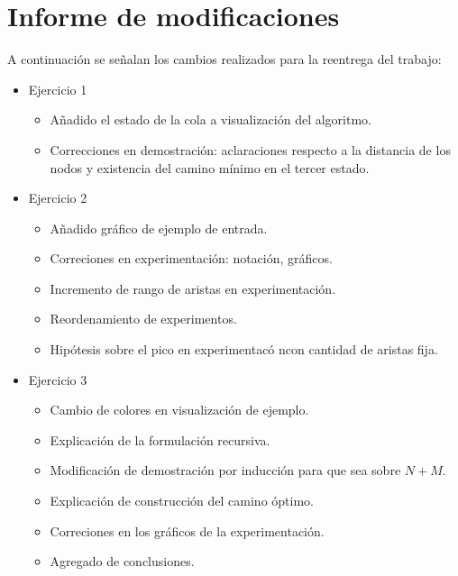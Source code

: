 \section*{Informe de modificaciones}

A continuación se señalan los cambios realizados para la reentrega del trabajo:

\begin{itemize}
	\item{
		Ejercicio 1
		\begin{itemize}
			\item{Añadido el estado de la cola a visualización del algoritmo.}
			\item{Correcciones en demostración: aclaraciones respecto a la distancia
				de los nodos y existencia del camino mínimo en el tercer estado.}
		\end{itemize}
	}
	\item{
		Ejercicio 2
		\begin{itemize}
			\item{Añadido gráfico de ejemplo de entrada.}
			\item{Correciones en experimentación: notación, gráficos.}
			\item{Incremento de rango de aristas en experimentación.}
			\item{Reordenamiento de experimentos.}
			\item{Hipótesis sobre el pico en experimentacó ncon cantidad de aristas fija.}
		\end{itemize}
	}
	\item{
		Ejercicio 3
		\begin{itemize}
			\item{Cambio de colores en visualización de ejemplo.}
			\item{Explicación de la formulación recursiva.}
			\item{Modificación de demostración por inducción para que sea sobre
				$N + M$.}
			\item{Explicación de construcción del camino óptimo.}
			\item{Correciones en los gráficos de la experimentación.}
			\item{Agregado de conclusiones.}
		\end{itemize}
	}
\end{itemize}
